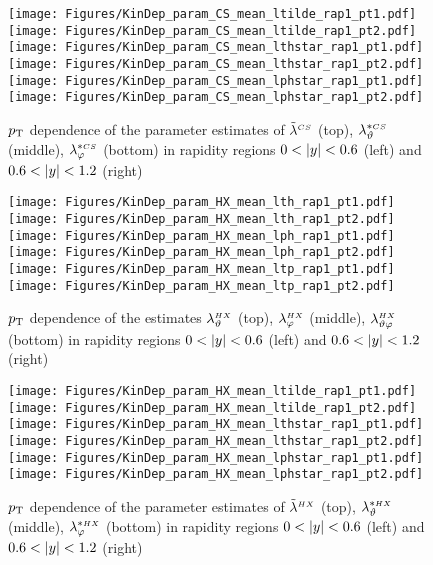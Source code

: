 \begin{figure}[htbp]
\centering
\texttt{[image: Figures/KinDep\_param\_CS\_mean\_ltilde\_rap1\_pt1.pdf]}
\texttt{[image: Figures/KinDep\_param\_CS\_mean\_ltilde\_rap1\_pt2.pdf]}
\texttt{[image: Figures/KinDep\_param\_CS\_mean\_lthstar\_rap1\_pt1.pdf]}
\texttt{[image: Figures/KinDep\_param\_CS\_mean\_lthstar\_rap1\_pt2.pdf]}
\texttt{[image: Figures/KinDep\_param\_CS\_mean\_lphstar\_rap1\_pt1.pdf]}
\texttt{[image: Figures/KinDep\_param\_CS\_mean\_lphstar\_rap1\_pt2.pdf]}
\caption{$p_\mathrm{T}$ dependence of the parameter estimates of $\tilde{\lambda}^{\scriptscriptstyle CS}$ (top),
$\lambda^{* \scriptscriptstyle CS}_\vartheta$ (middle), $\lambda^{* \scriptscriptstyle CS}_\varphi$ (bottom) in rapidity regions $0<\left | y \right |<0.6$ (left) and $0.6<\left | y \right |<1.2$ (right)}
\end{figure}
\clearpage








\begin{figure}[htbp]
\centering
\texttt{[image: Figures/KinDep\_param\_HX\_mean\_lth\_rap1\_pt1.pdf]}
\texttt{[image: Figures/KinDep\_param\_HX\_mean\_lth\_rap1\_pt2.pdf]}
\texttt{[image: Figures/KinDep\_param\_HX\_mean\_lph\_rap1\_pt1.pdf]}
\texttt{[image: Figures/KinDep\_param\_HX\_mean\_lph\_rap1\_pt2.pdf]}
\texttt{[image: Figures/KinDep\_param\_HX\_mean\_ltp\_rap1\_pt1.pdf]}
\texttt{[image: Figures/KinDep\_param\_HX\_mean\_ltp\_rap1\_pt2.pdf]}
\caption{$p_\mathrm{T}$ dependence of the estimates $\lambda^{\scriptscriptstyle HX}_\vartheta$ (top), $\lambda^{\scriptscriptstyle HX}_\varphi$ (middle), $\lambda^{\scriptscriptstyle HX}_{\vartheta \varphi}$ (bottom) in rapidity regions $0<\left | y \right |<0.6$ (left) and $0.6<\left | y \right |<1.2$ (right)}
\end{figure}
\clearpage

\begin{figure}[htbp]
\centering
\texttt{[image: Figures/KinDep\_param\_HX\_mean\_ltilde\_rap1\_pt1.pdf]}
\texttt{[image: Figures/KinDep\_param\_HX\_mean\_ltilde\_rap1\_pt2.pdf]}
\texttt{[image: Figures/KinDep\_param\_HX\_mean\_lthstar\_rap1\_pt1.pdf]}
\texttt{[image: Figures/KinDep\_param\_HX\_mean\_lthstar\_rap1\_pt2.pdf]}
\texttt{[image: Figures/KinDep\_param\_HX\_mean\_lphstar\_rap1\_pt1.pdf]}
\texttt{[image: Figures/KinDep\_param\_HX\_mean\_lphstar\_rap1\_pt2.pdf]}
\caption{$p_\mathrm{T}$ dependence of the parameter estimates of $\tilde{\lambda}^{\scriptscriptstyle HX}$ (top),
$\lambda^{* \scriptscriptstyle HX}_\vartheta$ (middle), $\lambda^{* \scriptscriptstyle HX}_\varphi$ (bottom) in rapidity regions $0<\left | y \right |<0.6$ (left) and $0.6<\left | y \right |<1.2$ (right)}
\end{figure}
\clearpage






